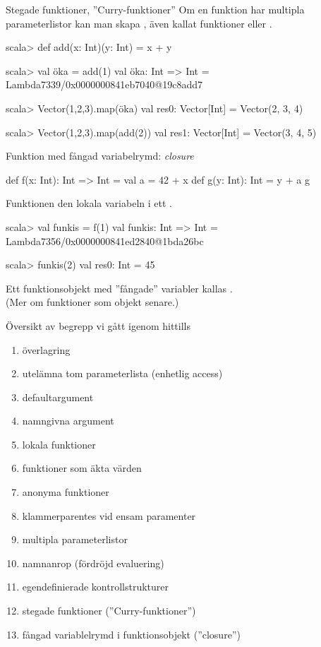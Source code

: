 \begin{Slide}{Stegade funktioner, ''Curry-funktioner''}
Om en funktion har multipla parameterlistor kan man skapa , även kallat  funktioner  eller .
\begin{REPLnonum}
scala> def add(x: Int)(y: Int) = x + y

scala> val öka = add(1)
val öka: Int => Int = Lambda7339/0x0000000841eb7040@19c8add7

scala> Vector(1,2,3).map(öka)
val res0: Vector[Int] = Vector(2, 3, 4)

scala> Vector(1,2,3).map(add(2))
val res1: Vector[Int] = Vector(3, 4, 5)
\end{REPLnonum}
\end{Slide}


\begin{Slide}{Funktion med fångad variabelrymd: \textit{closure}}
\begin{Code}
def f(x: Int): Int => Int = 
  val a = 42 + x
  def g(y: Int): Int = y + a
  g
\end{Code}
Funktionen   den lokala variabeln  i ett .
\pause
\begin{REPLnonum}
scala> val funkis = f(1)
val funkis: Int => Int = Lambda7356/0x0000000841ed2840@1bda26bc

scala> funkis(2)
val res0: Int = 45
\end{REPLnonum}
\pause
Ett funktionsobjekt med ''fångade'' variabler kallas . \\
(Mer om funktioner som objekt senare.)
\end{Slide}

\ifkompendium\else
\begin{SlideExtra}{Översikt av begrepp vi gått igenom hittills}
\begin{enumerate}
\item överlagring
\item utelämna tom parameterlista (enhetlig access)
\item defaultargument
\item namngivna argument
\item lokala funktioner
\item funktioner som äkta värden
\item anonyma funktioner
\item klammerparentes vid ensam paramenter
\item multipla parameterlistor
\item namnanrop (fördröjd evaluering)
\item egendefinierade kontrollstrukturer
\item stegade funktioner (''Curry-funktioner'')
\item fångad variablelrymd i funktionsobjekt (''closure'')
\end{enumerate}
\end{SlideExtra}
\fi




